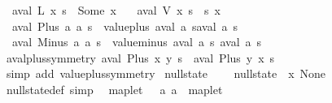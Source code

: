 \begin{isabellebody}
\ \ {\isachardoublequoteopen}aval\ {\isacharparenleft}L\ x{\isacharparenright}\ s\ {\isacharequal}\ Some\ x{\isachardoublequoteclose}\ {\isacharbar}\isanewline
\ \ {\isachardoublequoteopen}aval\ {\isacharparenleft}V\ x{\isacharparenright}\ s\ {\isacharequal}\ s\ x{\isachardoublequoteclose}\ {\isacharbar}\isanewline
\ \ {\isachardoublequoteopen}aval\ {\isacharparenleft}Plus\ a\ a\ s\ {\isacharequal}\ value{\isacharunderscore}plus\ {\isacharparenleft}aval\ a\ s{\isacharparenright}{\isacharparenleft}aval\ a\ s{\isacharparenright}{\isachardoublequoteclose}\ {\isacharbar}\isanewline
\ \ {\isachardoublequoteopen}aval\ {\isacharparenleft}Minus\ a\ a\ s\ {\isacharequal}\ value{\isacharunderscore}minus\ {\isacharparenleft}aval\ a\ s{\isacharparenright}\ {\isacharparenleft}aval\ a\ s{\isacharparenright}{\isachardoublequoteclose}\isanewline
\isanewline
{}\isamarkupfalse%
\ aval{\isacharunderscore}plus{\isacharunderscore}symmetry{\isacharcolon}\ {\isachardoublequoteopen}aval\ {\isacharparenleft}Plus\ x\ y{\isacharparenright}\ s\ {\isacharequal}\ aval\ {\isacharparenleft}Plus\ y\ x{\isacharparenright}\ s{\isachardoublequoteclose}\isanewline
%
\isadelimproof
\ \ %
\endisadelimproof
%
\isatagproof
{}\isamarkupfalse%
\ {\isacharparenleft}simp\ add{\isacharcolon}\ value{\isacharunderscore}plus{\isacharunderscore}symmetry{\isacharparenright}%
\endisatagproof
{\isafoldproof}%
%
\isadelimproof
\isanewline
%
\endisadelimproof
\isanewline
{}\isamarkupfalse%
\ null{\isacharunderscore}state\ {\isacharparenleft}{\isachardoublequoteopen}{\isacharless}{\isachargreater}{\isachardoublequoteclose}{\isacharparenright}\ \isanewline
\ \ {\isachardoublequoteopen}null{\isacharunderscore}state\ {\isasymequiv}\ {\isasymlambda}x{\isachardot}\ None{\isachardoublequoteclose}\isanewline
{}\isamarkupfalse%
\ null{\isacharunderscore}state{\isacharunderscore}def\ {\isacharbrackleft}simp{\isacharbrackright}\isanewline
\isanewline
{}\isamarkupfalse%
\isanewline
\ \ {\isachardoublequoteopen}{\isacharunderscore}maplet{\isachardoublequoteclose}\ \ {\isacharcolon}{\isacharcolon}\ {\isachardoublequoteopen}{\isacharbrackleft}{\isacharprime}a{\isacharcomma}\ {\isacharprime}a{\isacharbrackright}\ {\isasymRightarrow}\ maplet{\isachardoublequoteclose}\ \ \ \ \ \ \ \ \ \ \ \ \ {\isacharparenleft}{\isachardoublequoteopen}{\isacharunderscore}\ {\isacharslash}{\isacharcolon}{\isacharequal}{\isacharslash}\ {\isacharunderscore}{\isachardoublequoteclose}{\isacharparenright}\isanewline

\end{isabellebody}
